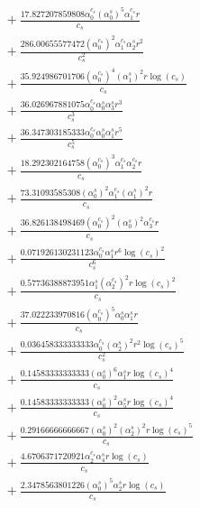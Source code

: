 \documentclass[10pt]{article}
\begin{document}
\begin{align*}
&{}  + \frac{17.827207859808 \alpha_{0}^{c_s} \left(\alpha_{0}^s\right)^{5} \alpha_{1}^{c_s} r}{c_{s}} \\
&{}  + \frac{286.00655577472 \left(\alpha_{0}^{c_s}\right)^{2} \alpha_{1}^{c_s} \alpha_{2}^s r^{2}}{c_{s}^{2}} \\
&{}  + \frac{35.924986701706 \left(\alpha_{0}^{c_s}\right)^{4} \left(\alpha_{1}^s\right)^{2} r \log{\left(c_{s} \right)}}{c_{s}} \\
&{}  + \frac{36.026967881075 \alpha_{0}^{c_s} \alpha_{0}^s \alpha_{3}^s r^{3}}{c_{s}^{3}} \\
&{}  + \frac{36.347303185333 \alpha_{0}^{c_s} \alpha_{0}^s \alpha_{1}^s r^{5}}{c_{s}^{5}} \\
&{}  + \frac{18.292302164758 \left(\alpha_{0}^{c_s}\right)^{3} \alpha_{1}^{c_s} \alpha_{2}^{c_s} r}{c_{s}} \\
&{}  + \frac{73.31093585308 \left(\alpha_{0}^s\right)^{2} \alpha_{1}^{c_s} \left(\alpha_{1}^s\right)^{2} r}{c_{s}} \\
&{}  + \frac{36.826138498469 \left(\alpha_{0}^{c_s}\right)^{2} \left(\alpha_{0}^s\right)^{2} \alpha_{3}^{c_s} r}{c_{s}} \\
&{}  + \frac{0.071926130231123 \alpha_{0}^{c_s} \alpha_{1}^s r^{6} \log{\left(c_{s} \right)}^{2}}{c_{s}^{6}} \\
&{}  + \frac{0.57736388873951 \alpha_{1}^s \left(\alpha_{2}^{c_s}\right)^{2} r \log{\left(c_{s} \right)}^{2}}{c_{s}} \\
&{}  + \frac{37.022233970816 \left(\alpha_{0}^{c_s}\right)^{5} \alpha_{0}^s \alpha_{1}^s r}{c_{s}} \\
&{}  + \frac{0.036458333333333 \alpha_{0}^{c_s} \left(\alpha_{2}^s\right)^{2} r^{2} \log{\left(c_{s} \right)}^{5}}{c_{s}^{2}} \\
&{}  + \frac{0.14583333333333 \left(\alpha_{0}^s\right)^{6} \alpha_{1}^s r \log{\left(c_{s} \right)}^{4}}{c_{s}} \\
&{}  + \frac{0.14583333333333 \left(\alpha_{0}^s\right)^{2} \alpha_{5}^s r \log{\left(c_{s} \right)}^{4}}{c_{s}} \\
&{}  + \frac{0.29166666666667 \left(\alpha_{0}^s\right)^{2} \left(\alpha_{2}^s\right)^{2} r \log{\left(c_{s} \right)}^{5}}{c_{s}} \\
&{}  + \frac{4.6706371720921 \alpha_{2}^{c_s} \alpha_{4}^s r \log{\left(c_{s} \right)}}{c_{s}} \\
&{}  + \frac{2.3478563801226 \left(\alpha_{0}^s\right)^{5} \alpha_{2}^s r \log{\left(c_{s} \right)}}{c_{s}} \\

\end{align*}
\end{document}
